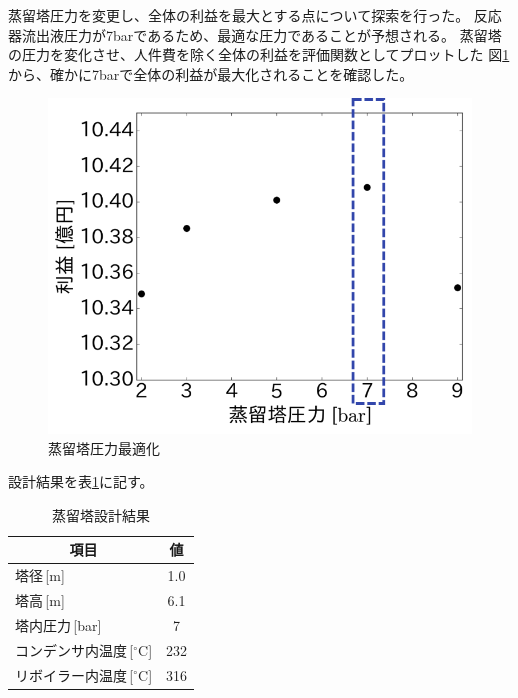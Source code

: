 \documentclass[a4j]{jsreport}
\begin{document}
蒸留塔圧力を変更し、全体の利益を最大とする点について探索を行った。
反応器流出液圧力が7barであるため、最適な圧力であることが予想される。
蒸留塔の圧力を変化させ、人件費を除く全体の利益を評価関数としてプロットした
図\ref{蒸留塔圧力最適化}から、確かに7barで全体の利益が最大化されることを確認した。
\begin{figure}[h]
    \begin{center}
        \includegraphics[scale=0.7]{DistillationPressue.png}
        \caption{蒸留塔圧力最適化}
        \label{蒸留塔圧力最適化}
    \end{center}
\end{figure}

設計結果を表\ref{蒸留塔設計結果}に記す。
\begin{table}[h]
    \caption{蒸留塔設計結果}
    \label{蒸留塔設計結果}
    \begin{center}
        \begin{tabular}{lc}\hline
            \multicolumn{1}{c}{項目}       &  値    \\   \hline
            塔径\,[m]                      &1.0    \\
            塔高\,[m]                      &6.1    \\
            塔内圧力\,[bar]                &7   \\
            コンデンサ内温度\,[$^\circ$C]       &232     \\
            リボイラー内温度\,[$^\circ$C]       &316    \\\hline
        \end{tabular}
    \end{center}
\end{table}
\end{document}
